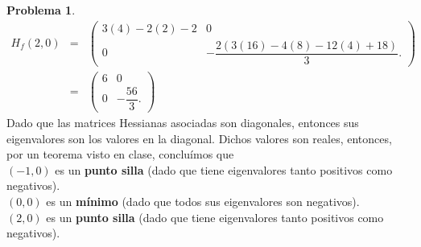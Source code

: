 \documentclass[12pt,letterpaper]{article}
\theoremstyle{definition}
\newtheorem{problm}{Problema}
\begin{document}
\begin{problm}
	\begin{eqnarray*}
		H_f(2,0) & = & \left(\begin{matrix}
			3(4) - 2(2) -2 & 0  \\
			0 & 
			-\dfrac{2 (3(16) - 4(8) - 12(4) +18)}{3}.
		\end{matrix}\right) \\
		& = & \left(\begin{matrix}
			 6 & 0 \\
			 0 & -\dfrac{56}{3}.
		\end{matrix}\right)
	\end{eqnarray*}
	Dado que las matrices Hessianas asociadas son diagonales, entonces sus eigenvalores son los valores en la diagonal. Dichos valores son reales, entonces, por un teorema visto en clase, concluímos que
	\\
	$ (-1,0) $ es un \textbf{punto silla} (dado que tiene eigenvalores tanto positivos como negativos).
	\\
	$ (0,0) $ es un \textbf{mínimo} (dado que todos sus eigenvalores son negativos).
	\\
	$ (2,0) $ es un \textbf{punto silla} (dado que tiene eigenvalores tanto positivos como negativos).
\end{problm}
\end{document}
